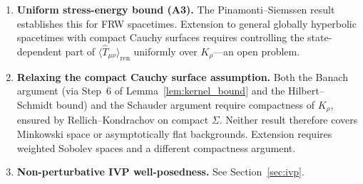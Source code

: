 \documentclass[12pt,a4paper]{article}
\begin{document}
\begin{enumerate}
\item \textbf{Uniform stress-energy bound (A3).} The Pinamonti--Siemssen
result~\cite{pinamonti_siemssen} establishes this for FRW spacetimes. Extension to general
globally hyperbolic spacetimes with compact Cauchy surfaces requires controlling the
state-dependent part of $\langle\hat{T}_{\mu\nu}\rangle_{\text{ren}}$ uniformly over
$K_\rho$---an open problem.

\item \textbf{Relaxing the compact Cauchy surface assumption.} Both the Banach argument
(via Step~6 of Lemma~\ref{lem:kernel_bound} and the Hilbert--Schmidt bound) and the
Schauder argument require compactness of $K_\rho$, ensured by Rellich--Kondrachov on
compact $\Sigma$. Neither result therefore covers Minkowski space or asymptotically flat
backgrounds. Extension requires weighted Sobolev spaces and a different compactness
argument.

\item \textbf{Non-perturbative IVP well-posedness.} See Section~\ref{sec:ivp}.

\end{enumerate}
\end{document}
